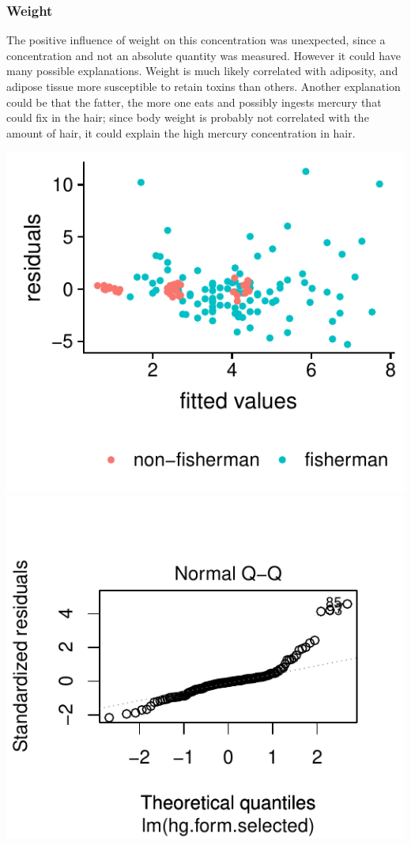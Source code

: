 \documentclass[12pt,]{article}
\begin{document}
\subsubsection{Weight}\label{weight}

The positive influence of weight on this concentration was unexpected,
since a concentration and not an absolute quantity was measured. However
it could have many possible explanations. Weight is much likely
correlated with adiposity, and adipose tissue more susceptible to retain
toxins than others. Another explanation could be that the fatter, the
more one eats and possibly ingests mercury that could fix in the hair;
since body weight is probably not correlated with the amount of hair, it
could explain the high mercury concentration in hair.

\includegraphics{Report_files/figure-latex/unnamed-chunk-18-1.pdf}
\includegraphics{Report_files/figure-latex/unnamed-chunk-18-2.pdf}
\end{document}

